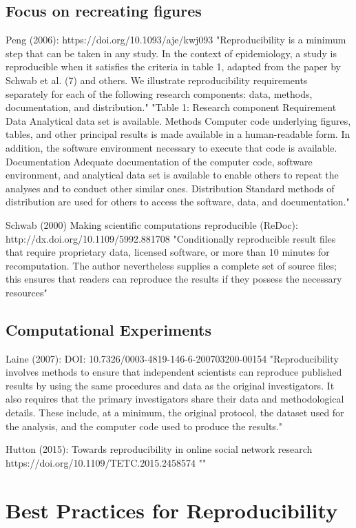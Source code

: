 \subsection{Focus on recreating figures}
Peng (2006): https://doi.org/10.1093/aje/kwj093
"Reproducibility is a minimum step that can be taken in any study. In the context of epidemiology, a study is reproducible when it satisfies the criteria in table 1, adapted from the paper by Schwab et al. (7) and others. We illustrate reproducibility requirements separately for each of the following research components: data, methods, documentation, and distribution."
"Table 1: Research component 	Requirement
Data 	Analytical data set is available.
Methods 	Computer code underlying figures, tables, and other principal results is made available in a human-readable form. In addition, the software environment necessary to execute that code is available.
Documentation 	Adequate documentation of the computer code, software environment, and analytical data set is available to enable others to repeat the analyses and to conduct other similar ones.
Distribution 	Standard methods of distribution are used for others to access the software, data, and documentation."

Schwab (2000) Making scientific computations reproducible (ReDoc): http://dx.doi.org/10.1109/5992.881708
"Conditionally reproducible result files that require proprietary data, licensed software, or more than 10 minutes for recomputation. The author nevertheless supplies a complete set of source files; this ensures that readers can reproduce the results if they possess the necessary resources"

\subsection{Computational Experiments}
Laine (2007): DOI: 10.7326/0003-4819-146-6-200703200-00154
"Reproducibility involves methods to ensure that independent scientists can reproduce published results by using the same procedures and data as the original investigators. It also requires that the primary investigators share their data and methodological details. These include, at a minimum, the original protocol, the dataset used for the analysis, and the computer code used to produce the results."

Hutton (2015):  Towards reproducibility in online social network research https://doi.org/10.1109/TETC.2015.2458574
""

\section{Best Practices for Reproducibility}

